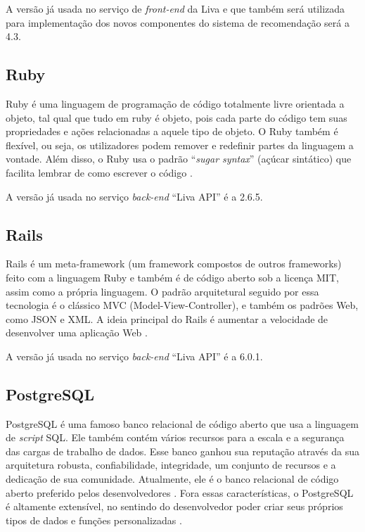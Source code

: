 A versão já usada no serviço de \textit{front-end} da Liva e que também será utilizada para implementação dos novos componentes do sistema de recomendação será a 4.3.

\subsection{Ruby}

Ruby é uma linguagem de programação de código totalmente livre orientada a objeto, tal qual que tudo em ruby é objeto, pois cada parte do código tem suas propriedades e ações relacionadas a aquele tipo de objeto. O Ruby também é flexível, ou seja, os utilizadores podem remover e redefinir partes da linguagem a vontade. Além disso, o Ruby usa o padrão “\textit{sugar syntax}” (açúcar sintático) que facilita lembrar de como escrever o código \cite{ruby:2019}.

A versão já usada no serviço \textit{back-end} “Liva API” é a 2.6.5.

\subsection{Rails}

Rails é um meta-framework (um framework compostos de outros frameworks) feito com a linguagem Ruby e também é de código aberto sob a licença MIT, assim como a própria linguagem. O padrão arquitetural seguido por essa tecnologia é o clássico MVC (Model-View-Controller), e também os padrões Web, como JSON e XML. A ideia principal do Rails é aumentar a velocidade de desenvolver uma aplicação Web \cite{portalgsti:2019}.

A versão já usada no serviço \textit{back-end} “Liva API” é a 6.0.1.

\subsection{PostgreSQL}

PostgreSQL é uma famoso banco relacional de código aberto que usa a linguagem de \textit{script} SQL. Ele também contém vários recursos para a escala e a segurança das cargas de trabalho de dados. Esse banco ganhou sua reputação através da sua arquitetura robusta, confiabilidade, integridade, um conjunto de recursos e a dedicação de sua comunidade. Atualmente, ele é o banco relacional de código aberto preferido pelos desenvolvedores \cite{postgres:2019}.
Fora essas características, o PostgreSQL é altamente extensível, no sentindo do desenvolvedor poder criar seus próprios tipos de dados e funções personalizadas \cite{postgres:2019}.


